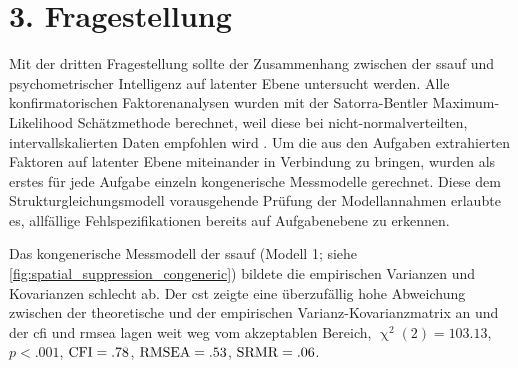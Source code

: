 \documentclass[11pt, twoside, a4paper]{book}		%
\begin{document}
















\clearpage
\section{3. Fragestellung \label{sec:3Fragestellung}}

Mit der dritten Fragestellung sollte der Zusammenhang zwischen der \gls{ssauf} und psychometrischer Intelligenz auf latenter Ebene untersucht werden. 
Alle konfirmatorischen Faktorenanalysen wurden mit der Satorra-Bentler Maximum-Likelihood Schätzmethode \citep{Satorra1994} berechnet, weil diese bei nicht-normal\-ver\-teilten, intervallskalierten Daten empfohlen wird \citep[z.B.][]{Curran1996, Finney2006}.
Um die aus den Aufgaben extrahierten Faktoren auf latenter Ebene miteinander in Verbindung zu bringen, wurden als erstes für jede Aufgabe einzeln kongenerische Messmodelle \citep{Joereskog1971} gerechnet. Diese dem Strukturgleichungsmodell vorausgehende Prüfung der Modellannahmen erlaubte es, allfällige Fehlspezifikationen bereits auf Aufgabenebene zu erkennen.

Das kongenerische Messmodell der \gls{ssauf} (Modell 1; siehe \autoref{fig:spatial_suppression_congeneric}) bildete die empirischen Varianzen und Kovarianzen schlecht ab.  Der \gls{cst} zeigte eine überzufällig hohe Abweichung zwischen der theoretische und der empirischen Var\-ianz-Ko\-var\-ianz\-ma\-trix an und der \gls{cfi} und \gls{rmsea} lagen weit weg vom akzeptablen Bereich, $\upchi^2(2)=103.13$, $p<.001$, $\textnormal{CFI}=.78$, $\textnormal{RMSEA}=.53$, $\textnormal{SRMR}=.06$.
\end{document}
